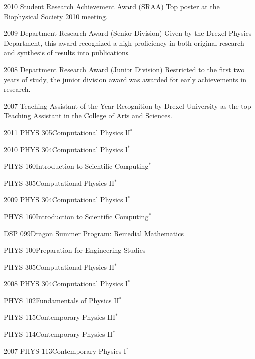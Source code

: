 \documentclass[]{scrartcl}
\begin{document}
\begin{cleanCV}
\WorkExperienceX
{2010}
{Student Research Achievement Award (SRAA)}
{Top poster at the Biophysical Society 2010 meeting. }

\WorkExperienceX
{2009}
{Department Research Award (Senior Division)}
{Given by the Drexel Physics Department, this award recognized a high proficiency in both original research and synthesis of results into publications.}

\WorkExperienceX
{2008}
{Department Research Award (Junior Division)}
{Restricted to the first two years of study, the junior division award was awarded for early achievements in research.}

\WorkExperienceX
{2007}
{Teaching Assistant of the Year} {}
{Recognition by Drexel University as the top Teaching Assistant in the College of Arts and Sciences.}



\newcommand{\TeachingNote}{$^*$}

\Teaching
{2011}
{PHYS 305}{Computational Physics II\TeachingNote}

\Teaching
{2010}
{PHYS 304}{Computational Physics I\TeachingNote}

\Teaching
{}
{PHYS 160}{Introduction to Scientific Computing\TeachingNote}

\Teaching
{}
{PHYS 305}{Computational Physics II\TeachingNote}

\Teaching
{2009}
{PHYS 304}{Computational Physics I\TeachingNote}

\Teaching
{}
{PHYS 160}{Introduction to Scientific Computing\TeachingNote}

\Teaching
{}
{DSP 099}{Dragon Summer Program: Remedial Mathematics}

\Teaching
{}
{PHYS 100}{Preparation for Engineering Studies}


\Teaching
{}
{PHYS 305}{Computational Physics II\TeachingNote}

\Teaching
{2008}
{PHYS 304}{Computational Physics I\TeachingNote}

\Teaching
{}
{PHYS 102}{Fundamentals of Physics II\TeachingNote}

\Teaching
{}
{PHYS 115}{Contemporary Physics III\TeachingNote}

\Teaching
{}
{PHYS 114}{Contemporary Physics II\TeachingNote}

\Teaching
{2007}
{PHYS 113}{Contemporary Physics I\TeachingNote}


\end{cleanCV}
\end{document}
